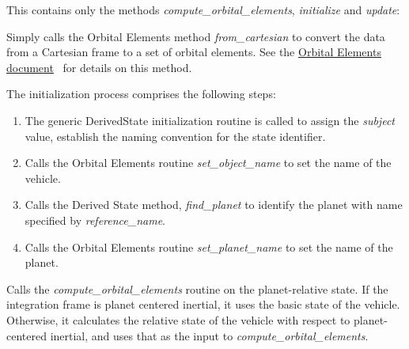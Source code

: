 \begin{itemize}

This contains only the methods \textit{compute\_orbital\_elements}, \textit{initialize} and \textit{update}:
\begin{enumerate}
Simply calls the Orbital Elements method \textit{from\_cartesian} to convert the data from a Cartesian frame to a set of orbital elements.  See the 
\href{file:\JEODHOME/models/utils/orbital_elements/docs/orbital_elements.pdf}{Orbital Elements document}~\cite{dynenv:ORBITALELEMENTS} for details on this method. 

The initialization process comprises the following steps:
\begin{enumerate}
\item{} The generic DerivedState initialization routine is called to assign the \textit{subject} value, establish the naming convention for the state identifier.  
\item{} Calls the Orbital Elements routine \textit{set\_object\_name} to set the name of the vehicle.
\item{} Calls the Derived State method, \textit{find\_planet} to identify the planet with name specified by \textit{reference\_name}.
\item{} Calls the Orbital Elements routine \textit{set\_planet\_name} to set the name of the planet.
\end{enumerate}

Calls the \textit{compute\_orbital\_elements} routine on the planet-relative state.  If the integration frame is planet centered inertial, it uses the basic state of the vehicle.  Otherwise, it calculates the relative state of the vehicle with respect to planet-centered inertial, and uses that as the input to \textit{compute\_orbital\_elements}.


\end{enumerate}
\end{itemize}
